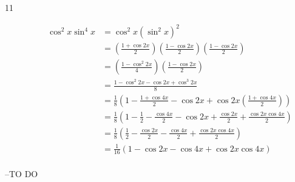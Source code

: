 \documentclass{exam}
\begin{document}
\begin{description}
      \item[11]
        \begin{align*}
          \cos^2 x \sin^4 x & = \cos^2 x \left( \sin^2 x \right)^2 \\
                            & = \left( \frac{1 + \cos 2x}{2} \right) \left( \frac{1 - \cos 2x}{2} \right) \left( \frac{1 - \cos 2x}{2} \right) \\
                            & = \left( \frac{1 - \cos^2 2x}{4} \right) \left( \frac{1 - \cos 2x}{2} \right) \\
                            & = \frac{1 - \cos^2 2x - \cos 2x + \cos^3 2x}{8} \\
                            & = \frac{1}{8} \left( 1 - \frac{1 + \cos 4x}{2} - \cos 2x + \cos 2x \left( \frac{1 + \cos 4x}{2} \right) \right) \\
                            & = \frac{1}{8} \left( 1 - \frac{1}{2} - \frac{\cos 4x}{2} - \cos 2x + \frac{\cos 2x}{2} + \frac{\cos 2x \cos 4x}{2} \right) \\
                            & = \frac{1}{8} \left( \frac{1}{2} - \frac{\cos 2x}{2} - \frac{\cos 4x}{2} + \frac{\cos 2x \cos 4x}{2} \right) \\
                            & = \frac{1}{16} ( 1 - \cos 2x - \cos 4x + \cos 2x \cos 4x ) \\
        \end{align*}

    \end{description}

  \else
    \vspace{5 cm}

    \begin{quote}
      \begin{em}
      \end{em}
    \end{quote}
    \hspace{1 cm} --TO DO
  \fi
\end{document}
